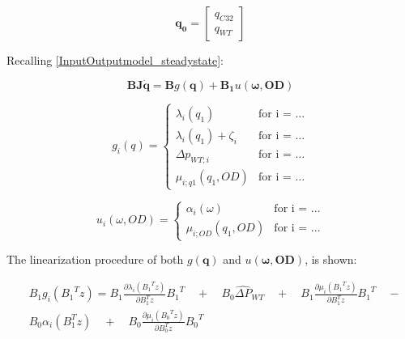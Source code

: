 \begin{equation}
\pmb{q_0} =
\begin{bmatrix}
         q_{C32} \\
	q_{WT}
\end{bmatrix}
\label{qvector}
\end{equation}

Recalling \eqref{InputOutputmodel_steadystate}:

\begin{equation}
 \pmb{B}\pmb{J} \pmb{\dot{q}} = \pmb{B} g(\pmb{q})+ \pmb{B_1} u(\pmb{\omega},\pmb{OD})
 \label{InputOutputmodel_steadystate_linmodel}
\end{equation}

\begin{equation}
\label{gfunction}
 g_{i}(q) =
		\left\{
		\begin{array}{ll}
		
		\lambda_i(q_1) 			&      \text{for i = ...}	
\\
		\lambda_i(q_1) + \zeta_i                      &     \text{for i = ...}
\\

                \Delta p_{WT;i}                       &      \text{for i = ...}
\\

                \mu_{i;q1}(q_1, OD)                       &      \text{for i = ...}

		\end{array}
		\right.
\end{equation}	

\begin{equation}
\label{ufunction}
 u_{i}(\omega, OD) =
		\left\{
		\begin{array}{ll}
		
		\alpha_i(\omega) 			&      \text{for i = ...}	
\\
		\mu_{i;OD}(q_1, OD)                      &     \text{for i = ...}

		\end{array}
		\right.
\end{equation}	

The linearization procedure of both $g(\pmb{q})$ and $u(\pmb{\omega},\pmb{OD})$, is shown:

\begin{equation}
  \begin{split}
  & B_1 g_{i}({B_{1}}^{T}z) = B_1 \frac{\partial{\lambda_{i}({{B_{1}}^{T}z})}}{\partial{B_{1}^{T}z}} {B_1}^{T} \quad + \quad
  B_0 {\hat{\Delta P}}_{WT} \quad + \quad B_1 \frac{\partial{\mu_{i}({{B_{1}}^{T}z})}}{\partial{B_{1}^{T}z}} {B_1}^{T} \quad - \\
  &  B_0 \alpha_{i}(B_{1}^{T}z) \quad + \quad B_0 \frac{\partial{\mu_{i}({{B_{0}}^{T}z})}}{\partial{B_{0}^{T}z}} {B_0}^{T}
  \end{split}
\end{equation}

